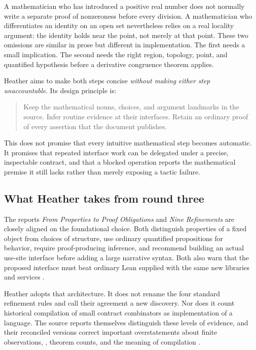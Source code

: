 \documentclass[11pt,letterpaper]{article}
\newcommand{\code}[1]{\texttt{\detokenize{#1}}}
\theoremstyle{definition}\newtheorem{definition}[theorem]{Definition}
\theoremstyle{remark}\newtheorem{remark}[theorem]{Remark}
\begin{document}
A mathematician who has introduced a positive real number does not normally
write a separate proof of nonzeroness before every division. A mathematician
who differentiates an identity on an open set nevertheless relies on a real
locality argument: the identity holds near the point, not merely at that point.
These two omissions are similar in prose but different in implementation. The
first needs a small implication. The second needs the right region, topology,
point, and quantified hypothesis before a derivative congruence theorem applies.

Heather aims to make both steps concise \emph{without making either step
unaccountable}. Its design principle is:
\begin{quote}
Keep the mathematical nouns, choices, and argument landmarks in the source.
Infer routine evidence at their interfaces. Retain an ordinary proof of every
assertion that the document publishes.
\end{quote}
This does not promise that every intuitive mathematical step becomes automatic.
It promises that repeated interface work can be delegated under a precise,
inspectable contract, and that a blocked operation reports the mathematical
premise it still lacks rather than merely exposing a tactic failure.

\subsection{What Heather takes from round three}
The reports \emph{From Properties to Proof Obligations} and \emph{Nine
Refinements} are closely aligned on the foundational choice. Both distinguish
properties of a fixed object from choices of structure, use ordinary quantified
propositions for behavior, require proof-producing inference, and recommend
building an actual use-site interface before adding a large narrative syntax.
Both also warn that the proposed interface must beat ordinary Lean supplied
with the same new libraries and services \cite{round3a,round3b}.

Heather adopts that architecture. It does not rename the four standard
refinement rules and call their agreement a new discovery. Nor does it count
historical compilation of small contract combinators as implementation of a
language. The source reports themselves distinguish these levels of evidence,
and their reconciled versions correct important overstatements about finite
observations, \code{List Empty}, theorem counts, and the meaning of compilation
\cite{round3a,round3b}.
\end{document}
